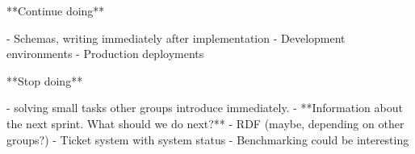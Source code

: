     **Continue doing**
    
    - Schemas, writing immediately after implementation
    - Development environments
    - Production deployments
    
    **Stop doing**
    
    - solving small tasks other groups introduce immediately.
- **Information about the next sprint. What should we do next?**
    - RDF (maybe, depending on other groups?)
    - Ticket system with system status
    - Benchmarking could be interesting